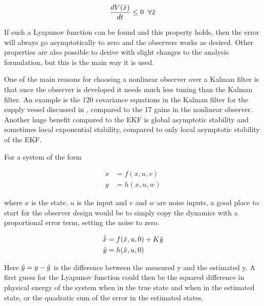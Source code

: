 \begin{equation}
    \frac{d V(\Tilde{x})}{dt} \leq 0 \;\; \forall \hat{x}
\end{equation}

If such a Lyapunov function can be found and this property holds, then the error will always go asymptotically to zero and the observers works as desired. Other properties are also possible to derive with slight changes to the analysis formulation, but this is the main way it is used. 

One of the main reasons for choosing a nonlinear observer over a Kalman filter is that once the observer is developed it needs much less tuning than the Kalman filter. An example is the 120 covariance equations in the Kalman filter for the supply vessel discussed in \cite{PassiveFossen}, compared to the 17 gains in the nonlinear observer. Another huge benefit compared to the EKF is global asymptotic stability and sometimes local exponential stability, compared to only local asymptotic stability of the EKF. 

For a system of the form 

\begin{align}
    \Dot{x} &= f(x,u,v) \\
    y &= h(x,u,w)
\end{align}

where $x$ is the state, $u$ is the input and $v$ and $w$ are noise inputs, a good place to start for the observer design would be to simply copy the dynamics with a proportional error term, setting the noise to zero.

\begin{align}
    \Dot{\hat{x}} &= f(\hat{x}, u, 0) + K\Tilde{y} \\
    \hat{y} &= h(\hat{x}, u, 0)
\end{align}

Here $\Tilde{y} = y -  \hat{y}$ is the difference between the measured y and the estimated y. A first guess for the Lyapunov function could then be the squared difference in physical energy of the system when in the true state and when in the estimated state, or the quadratic sum of the error in the estimated states. 